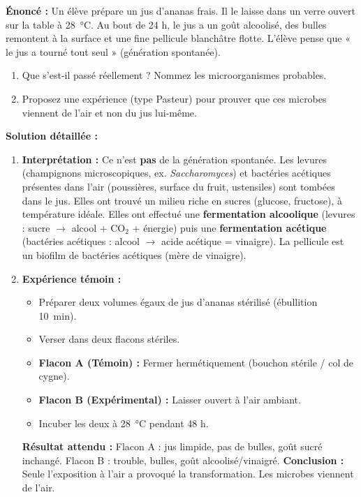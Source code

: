 \documentclass[11pt]{article}
\begin{document}
\begin{exoresolu}
\textbf{Énoncé :} Un élève prépare un jus d'ananas frais. Il le laisse dans un verre ouvert sur la table à \SI{28}{\celsius}. Au bout de 24 h, le jus a un goût alcoolisé, des bulles remontent à la surface et une fine pellicule blanchâtre flotte. L'élève pense que « le jus a tourné tout seul » (génération spontanée).
\begin{enumerate}
    \item Que s'est-il passé réellement ? Nommez les microorganismes probables.
    \item Proposez une expérience (type Pasteur) pour prouver que ces microbes viennent de l'air et non du jus lui-même.
\end{enumerate}
\tcblower
\textbf{Solution détaillée :}
\begin{enumerate}
    \item \textbf{Interprétation :} Ce n'est \textbf{pas} de la génération spontanée. Les levures (champignons microscopiques, ex. \emph{Saccharomyces}) et bactéries acétiques présentes dans l'air (poussières, surface du fruit, ustensiles) sont tombées dans le jus. Elles ont trouvé un milieu riche en sucres (glucose, fructose), à température idéale. Elles ont effectué une \textbf{fermentation alcoolique} (levures : sucre $\to$ alcool + CO$_2$ + énergie) puis une \textbf{fermentation acétique} (bactéries acétiques : alcool $\to$ acide acétique = vinaigre). La pellicule est un biofilm de bactéries acétiques (mère de vinaigre).
    \item \textbf{Expérience témoin :}
    \begin{itemize}
        \item Préparer deux volumes égaux de jus d'ananas stérilisé (ébullition \SI{10}{min}).
        \item Verser dans deux flacons stériles.
        \item \textbf{Flacon A (Témoin) :} Fermer hermétiquement (bouchon stérile / col de cygne).
        \item \textbf{Flacon B (Expérimental) :} Laisser ouvert à l'air ambiant.
        \item Incuber les deux à \SI{28}{\celsius} pendant 48 h.
    \end{itemize}
    \textbf{Résultat attendu :} Flacon A : jus limpide, pas de bulles, goût sucré inchangé. Flacon B : trouble, bulles, goût alcoolisé/vinaigré.
    \textbf{Conclusion :} Seule l'exposition à l'air a provoqué la transformation. Les microbes viennent de l'air.
\end{enumerate}
\end{exoresolu}
\end{document}
